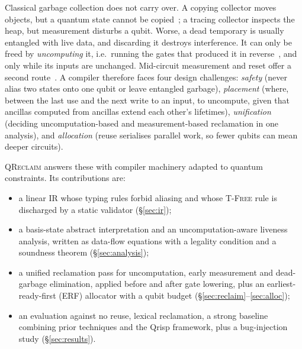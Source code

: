 \documentclass[conference,a4paper]{IEEEtran}
\newcommand{\QR}{\textup{\textsc{QReclaim}}}
\begin{document}
Classical garbage collection does not carry over. A copying collector moves objects, but a quantum state cannot be copied~\cite{wootters1982}; a tracing collector inspects the heap, but measurement disturbs a qubit. Worse, a dead temporary is usually entangled with live data, and discarding it destroys interference. It can only be freed by \emph{uncomputing} it, i.e.\ running the gates that produced it in reverse~\cite{bennett1973}, and only while its inputs are unchanged. Mid-circuit measurement and reset offer a second route~\cite{caqr,decross2023}. A compiler therefore faces four design challenges: \emph{safety} (never alias two states onto one qubit or leave entangled garbage), \emph{placement} (where, between the last use and the next write to an input, to uncompute, given that ancillas computed from ancillas extend each other's lifetimes), \emph{unification} (deciding uncomputation-based and measurement-based reclamation in one analysis), and \emph{allocation} (reuse serialises parallel work, so fewer qubits can mean deeper circuits).

\QR{} answers these with compiler machinery adapted to quantum constraints. Its contributions are:
\begin{itemize}
\item a linear IR whose typing rules forbid aliasing and whose \textsc{T-Free} rule is discharged by a static validator (\S\ref{sec:ir});
\item a basis-state abstract interpretation and an uncomputation-aware liveness analysis, written as data-flow equations with a legality condition and a soundness theorem (\S\ref{sec:analysis});
\item a unified reclamation pass for uncomputation, early measurement and dead-garbage elimination, applied before and after gate lowering, plus an earliest-ready-first (ERF) allocator with a qubit budget (\S\ref{sec:reclaim}--\ref{sec:alloc});
\item an evaluation against no reuse, lexical reclamation, a strong baseline combining prior techniques and the Qrisp framework, plus a bug-injection study (\S\ref{sec:results}).
\end{itemize}

\end{document}
